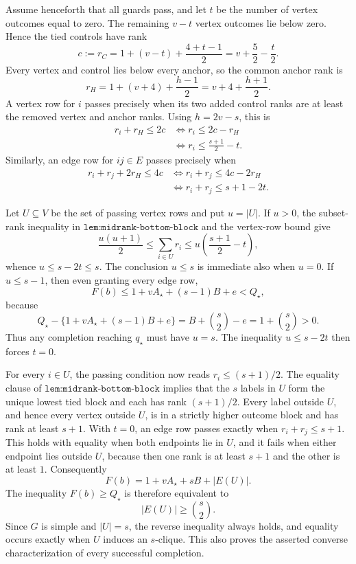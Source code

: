 Assume henceforth that all guards pass, and let \(t\) be the number of vertex outcomes equal to zero.  The remaining \(v-t\) vertex outcomes lie below zero.  Hence the tied controls have rank
\[
 c:=r_C
 =1+(v-t)+\frac{4+t-1}{2}
 =v+\frac52-\frac t2.
\]
Every vertex and control lies below every anchor, so the common anchor rank is
\[
 r_H
 =1+(v+4)+\frac{h-1}{2}
 =v+4+\frac{h+1}{2}.
\]
A vertex row for \(i\) passes precisely when its two added control ranks are at least the removed vertex and anchor ranks.  Using \(h=2v-s\), this is
\[
\begin{aligned}
 r_i+r_H\le2c
 &\Longleftrightarrow
 r_i\le 2c-r_H\\
 &\Longleftrightarrow
 r_i\le\frac{s+1}{2}-t.
\end{aligned}
\]
Similarly, an edge row for \(ij\in E\) passes precisely when
\[
\begin{aligned}
 r_i+r_j+2r_H\le4c
 &\Longleftrightarrow
 r_i+r_j\le4c-2r_H\\
 &\Longleftrightarrow
 r_i+r_j\le s+1-2t.
\end{aligned}
\]

Let \(U\subseteq V\) be the set of passing vertex rows and put \(u=|U|\).  If \(u>0\), the subset-rank inequality in \(\texttt{lem:midrank-bottom-block}\) and the vertex-row bound give
\[
 \frac{u(u+1)}2
 \le\sum_{i\in U}r_i
 \le u\left(\frac{s+1}{2}-t\right),
\]
whence \(u\le s-2t\le s\).  The conclusion \(u\le s\) is immediate also when \(u=0\).  If \(u\le s-1\), then even granting every edge row,
\[
 F(b)\le1+vA_\star+(s-1)B+e<Q_\star,
\]
because
\[
 Q_\star-\{1+vA_\star+(s-1)B+e\}
 =B+\binom{s}{2}-e
 =1+\binom{s}{2}>0.
\]
Thus any completion reaching \(q_\star\) must have \(u=s\).  The inequality \(u\le s-2t\) then forces \(t=0\).

For every \(i\in U\), the passing condition now reads \(r_i\le(s+1)/2\).  The equality clause of \(\texttt{lem:midrank-bottom-block}\) implies that the \(s\) labels in \(U\) form the unique lowest tied block and each has rank \((s+1)/2\).  Every label outside \(U\), and hence every vertex outside \(U\), is in a strictly higher outcome block and has rank at least \(s+1\).  With \(t=0\), an edge row passes exactly when \(r_i+r_j\le s+1\).  This holds with equality when both endpoints lie in \(U\), and it fails when either endpoint lies outside \(U\), because then one rank is at least \(s+1\) and the other is at least \(1\).  Consequently
\[
 F(b)=1+vA_\star+sB+|E(U)|.
\]
The inequality \(F(b)\ge Q_\star\) is therefore equivalent to
\[
 |E(U)|\ge\binom{s}{2}.
\]
Since \(G\) is simple and \(|U|=s\), the reverse inequality always holds, and equality occurs exactly when \(U\) induces an \(s\)-clique.  This also proves the asserted converse characterization of every successful completion.

